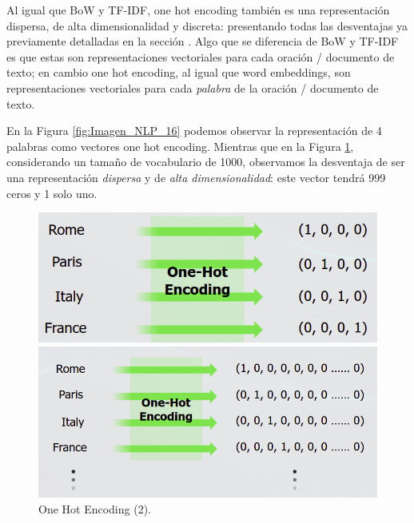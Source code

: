 \documentclass[12pt,a4paper]{article}
\begin{document}
\begin{sloppypar}
Al igual que BoW y TF-IDF,  one hot encoding también es una representación dispersa, de alta dimensionalidad y discreta: presentando todas las desventajas ya previamente detalladas en la sección \textit{}. Algo que se diferencia de BoW y TF-IDF es que estas son representaciones vectoriales para cada oración / documento de texto; en cambio one hot encoding, al igual que word embeddings, son representaciones vectoriales para cada \textit{palabra} de la oración / documento de texto. 

En la Figura \ref{fig:Imagen_NLP_16} podemos observar la representación de 4 palabras como vectores one hot encoding. Mientras que en la Figura \ref{fig:Imagen_NLP_17}, considerando un tamaño de vocabulario de 1000, observamos la desventaja de ser una representación \textit{dispersa} y de \textit{alta dimensionalidad}: este vector tendrá 999 ceros y 1 solo uno.

\begin{figure}[H] %
\begin{minipage}[b]{0.5\linewidth}
\centering
\includegraphics[width=\linewidth]{images/NLP/16.png}
\caption{One Hot Encoding (1)\cite{NLP_28}.}
\label{fig:Imagen_NLP_16}
\end{minipage}
\hspace{0.5cm}
\begin{minipage}[b]{0.5\linewidth}
\centering
\includegraphics[width=\linewidth]{images/NLP/17.png}
\caption{One Hot Encoding (2)\cite{NLP_28}.}
\label{fig:Imagen_NLP_17}
\end{minipage}
\end{figure}


\end{sloppypar}
\end{document}
